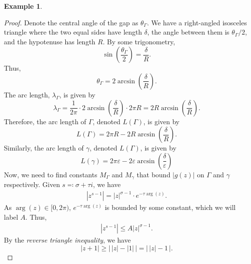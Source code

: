 \documentclass[a4paper]{article}
\theoremstyle{definition}
\newtheorem{example}[theorem]{Example}
\begin{document}
\begin{example}
\begin{proof}
        Denote the central angle of the gap as $\theta_\Gamma$.
        We have a right-angled isosceles triangle where the two equal sides have length $\delta$, the angle between them is $\theta_\Gamma / 2$, and the hypotenuse has length $R$.
        By some trigonometry,
        \begin{equation*}
            \sin \left(\frac{\theta_\Gamma}{2}\right) = \frac{\delta}{R}.
        \end{equation*}
        Thus,
        \begin{equation*}
            \theta_\Gamma = 2 \arcsin \left( \frac{\delta}{R}\right).
        \end{equation*}
        The arc length, $\lambda_\Gamma$, is given by
        \begin{equation*}
            \lambda_\Gamma = \frac{1}{2\pi} \cdot 2 \arcsin \left( \frac{\delta}{R}\right) \cdot 2\pi R = 2 R \arcsin \left( \frac{\delta}{R}\right).
        \end{equation*}
        Therefore, the arc length of $\Gamma$, denoted $L(\Gamma)$, is given by
        \begin{equation*}
            L(\Gamma) = 2\pi R - 2 R \arcsin \left( \frac{\delta}{R}\right).
        \end{equation*}
        Similarly, the arc length of $\gamma$, denoted $L(\Gamma)$, is given by
        \begin{equation*}
            L(\gamma) = 2\pi \varepsilon - 2 \varepsilon \arcsin \left( \frac{\delta}{\varepsilon}\right)
        \end{equation*}
        Now, we need to find constants $M_\Gamma$ and $M_\gamma$ that bound $\lvert g(z) \rvert$ on $\Gamma$ and $\gamma$ respectively.
        Given $s \eqcolon \sigma + \tau i$, we have
        \begin{align*}
            \left\lvert z^{s-1} \right\rvert = \lvert z \rvert^{\sigma-1} \cdot e^{-\tau \arg(z)}.
        \end{align*}
        As $\arg(z) \in [0,2\pi)$, $e^{-\tau \arg(z)}$ is bounded by some constant, which we will label $A$.
        Thus,
        \begin{align*}
            \left\lvert z^{s-1} \right\rvert \leq A \lvert z \rvert^{\sigma-1}.
        \end{align*}
        By the \emph{reverse triangle inequality}, we have
        \begin{equation*}
            \lvert z + 1 \rvert \geq \lvert \, \lvert z \rvert - \lvert 1 \rvert \, \rvert = \lvert \, \lvert z \rvert - 1 \, \rvert.

\end{equation*}
\end{proof}
\end{example}
\end{document}
